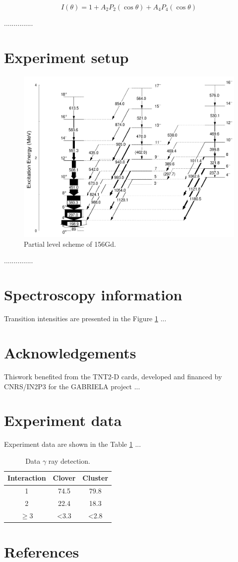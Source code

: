 \documentclass[3p,12pt]{elsarticle}%
\begin{document}
\begin{equation}
\label{equa:distr}
I(\theta) = 1 + A_{2}P_{2}(\cos{\theta}) + A_{4}P_{4}(\cos{\theta})
\end{equation}

...............
\section{Experiment setup}

\begin{figure}[!htb]
\centering
	\includegraphics[width=0.5\linewidth]{156Gd.png}
	\caption{Partial level scheme of 156Gd.}
	\label{fig:156Gd}
\end{figure}

...............

\section{Spectroscopy information}
Transition intensities are presented in the Figure \ref{fig:156Gd} ... 

\section{Acknowledgements}

Thiswork benefited from the TNT2-D cards, developed and financed by CNRS/IN2P3 for the GABRIELA project ...


\appendix
\section{Experiment data}
\label{app:expdata}

Experiment data are shown in the Table \ref{tab:data} ... 

\begin{table}[!htb]
\centering
	\caption{Data $\gamma$ ray detection.}
	\label{tab:data} 
	\begin{tabular}{ccc}
		\hline
		Interaction	& Clover 	& Cluster\\
		\hline
		1	& 74.5 & 79.8\\
		2	& 22.4 & 18.3\\
		$\ge$3	& <3.3 & <2.8\\
		\hline
	\end{tabular}
\end{table}


\section*{References}
 

\end{document}
